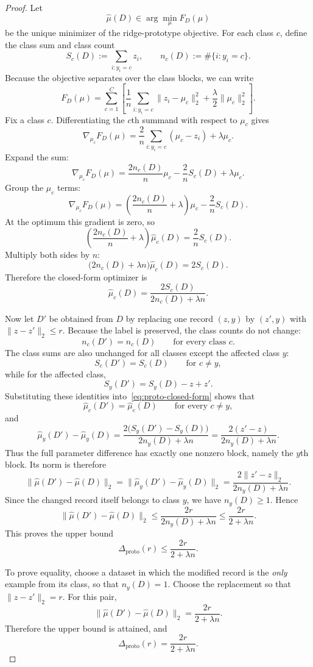 \documentclass[conference,compsoc]{IEEEtran}
\begin{document}
\begin{proof}
Let
\[
\widehat\mu(D)\in\arg\min_\mu F_D(\mu)
\]
be the unique minimizer of the ridge-prototype objective. For each class $c$, define the class sum and class count
\[
S_c(D):=\sum_{i:y_i=c} z_i,
\qquad
n_c(D):=\#\{i:y_i=c\}.
\]
Because the objective separates over the class blocks, we can write
\[
F_D(\mu)
=
\sum_{c=1}^C
\left[
\frac{1}{n}\sum_{i:y_i=c}\|z_i-\mu_c\|_2^2
+
\frac{\lambda}{2}\|\mu_c\|_2^2
\right].
\]
Fix a class $c$. Differentiating the $c$th summand with respect to $\mu_c$ gives
\[
\nabla_{\mu_c}F_D(\mu)
=
\frac{2}{n}\sum_{i:y_i=c}(\mu_c-z_i)+\lambda\mu_c.
\]
Expand the sum:
\[
\nabla_{\mu_c}F_D(\mu)
=
\frac{2n_c(D)}{n}\mu_c-
\frac{2}{n}S_c(D)+\lambda\mu_c.
\]
Group the $\mu_c$ terms:
\[
\nabla_{\mu_c}F_D(\mu)
=
\left(\frac{2n_c(D)}{n}+\lambda\right)\mu_c-
\frac{2}{n}S_c(D).
\]
At the optimum this gradient is zero, so
\[
\left(\frac{2n_c(D)}{n}+\lambda\right)\widehat\mu_c(D)=\frac{2}{n}S_c(D).
\]
Multiply both sides by $n$:
\[
\bigl(2n_c(D)+\lambda n\bigr)\widehat\mu_c(D)=2S_c(D).
\]
Therefore the closed-form optimizer is
\begin{equation}
\label{eq:proto-closed-form}
\widehat\mu_c(D)=\frac{2S_c(D)}{2n_c(D)+\lambda n}.
\end{equation}

Now let $D'$ be obtained from $D$ by replacing one record $(z,y)$ by $(z',y)$ with $\|z-z'\|_2\le r$. Because the label is preserved, the class counts do not change:
\[
n_c(D')=n_c(D)\qquad \text{for every class }c.
\]
The class sums are also unchanged for all classes except the affected class $y$:
\[
S_c(D')=S_c(D)\qquad \text{for }c\neq y,
\]
while for the affected class,
\[
S_y(D')=S_y(D)-z+z'.
\]
Substituting these identities into~\eqref{eq:proto-closed-form} shows that
\[
\widehat\mu_c(D')=\widehat\mu_c(D)\qquad \text{for every }c\neq y,
\]
and
\[
\widehat\mu_y(D')-
\widehat\mu_y(D)
=
\frac{2\bigl(S_y(D')-S_y(D)\bigr)}{2n_y(D)+\lambda n}
=
\frac{2(z'-z)}{2n_y(D)+\lambda n}.
\]
Thus the full parameter difference has exactly one nonzero block, namely the $y$th block. Its norm is therefore
\[
\|\widehat\mu(D')-\widehat\mu(D)\|_2
=
\|\widehat\mu_y(D')-\widehat\mu_y(D)\|_2
=
\frac{2\|z'-z\|_2}{2n_y(D)+\lambda n}.
\]
Since the changed record itself belongs to class $y$, we have $n_y(D)\ge 1$. Hence
\[
\|\widehat\mu(D')-\widehat\mu(D)\|_2
\le
\frac{2r}{2n_y(D)+\lambda n}
\le
\frac{2r}{2+\lambda n}.
\]
This proves the upper bound
\[
\Delta_{\mathrm{proto}}(r)\le \frac{2r}{2+\lambda n}.
\]

To prove equality, choose a dataset in which the modified record is the \emph{only} example from its class, so that $n_y(D)=1$. Choose the replacement so that $\|z-z'\|_2=r$. For this pair,
\[
\|\widehat\mu(D')-\widehat\mu(D)\|_2
=
\frac{2r}{2+\lambda n}.
\]
Therefore the upper bound is attained, and
\[
\Delta_{\mathrm{proto}}(r)=\frac{2r}{2+\lambda n}.
\]
\end{proof}
\end{document}
